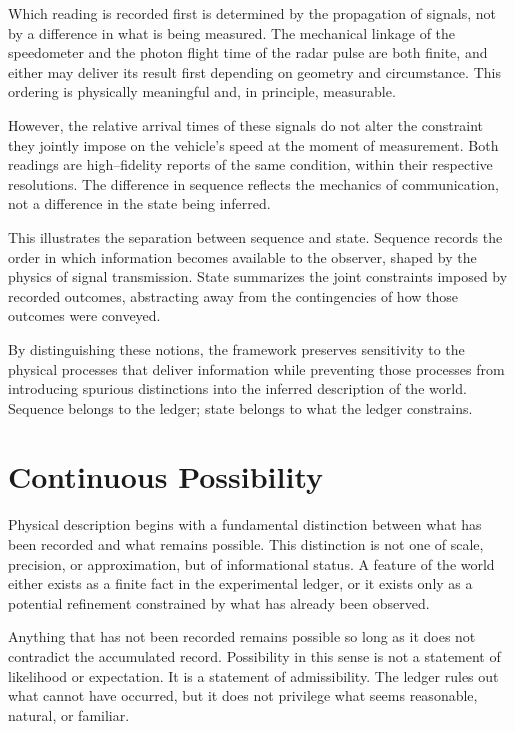 Which reading is recorded first is determined by the propagation of signals,
not by a difference in what is being measured. The mechanical linkage of the
speedometer and the photon flight time of the radar pulse are both finite, and
either may deliver its result first depending on geometry and circumstance.
This ordering is physically meaningful and, in principle, measurable.

However, the relative arrival times of these signals do not alter the
constraint they jointly impose on the vehicle’s speed at the moment of
measurement. Both readings are high--fidelity reports of the same condition,
within their respective resolutions. The difference in sequence reflects the
mechanics of communication, not a difference in the state being inferred.

This illustrates the separation between sequence and state. Sequence records
the order in which information becomes available to the observer, shaped by the
physics of signal transmission. State summarizes the joint constraints imposed
by recorded outcomes, abstracting away from the contingencies of how those
outcomes were conveyed.

By distinguishing these notions, the framework preserves sensitivity to the
physical processes that deliver information while preventing those processes
from introducing spurious distinctions into the inferred description of the
world. Sequence belongs to the ledger; state belongs to what the ledger
constrains.



\section{Continuous Possibility}
\label{sec:discrete-continuous}

Physical description begins with a fundamental distinction between what has
been recorded and what remains possible. This distinction is not one of scale,
precision, or approximation, but of informational status. A feature of the world
either exists as a finite fact in the experimental ledger, or it exists only as a
potential refinement constrained by what has already been observed.

Anything that has not been recorded remains possible so long as it does not
contradict the accumulated record. Possibility in this sense is not a statement
of likelihood or expectation. It is a statement of admissibility. The ledger
rules out what cannot have occurred, but it does not privilege what seems
reasonable, natural, or familiar.

